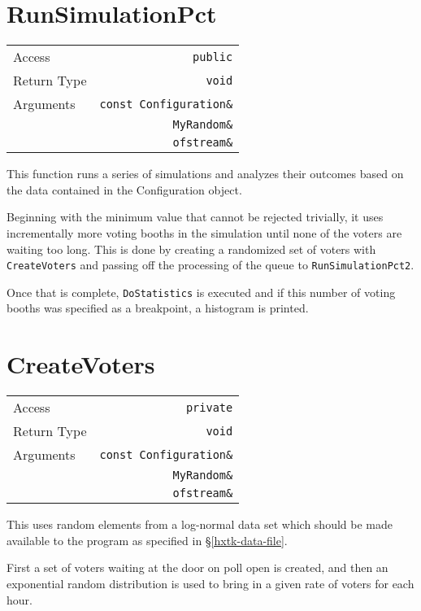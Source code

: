 \section{RunSimulationPct}

\begin{center}
\begin{tabular}{l r}
Access & \texttt{public} \\
Return Type & \texttt{void} \\ \hline
Arguments & \texttt{const Configuration\&}\\
          & \texttt{MyRandom\&}\\
          & \texttt{ofstream\&}
\end{tabular}
\end{center}

This function runs a series of simulations and analyzes their outcomes based on the data contained in the Configuration object.

Beginning with the minimum value that cannot be rejected trivially, it uses incrementally more voting booths in the simulation until none of the voters are waiting too long. This is done by creating a randomized set of voters with \texttt{CreateVoters} and passing off the processing of the queue to \texttt{RunSimulationPct2}.

Once that is complete, \texttt{DoStatistics} is executed and if this number of voting booths was specified as a breakpoint, a histogram is printed.

\section{CreateVoters}

\begin{center}
\begin{tabular}{l r}
Access & \texttt{private} \\
Return Type & \texttt{void} \\ \hline
Arguments & \texttt{const Configuration\&}\\
          & \texttt{MyRandom\&}\\
          & \texttt{ofstream\&}
\end{tabular}
\end{center}

This uses random elements from a log-normal data set which should be made available to the program as specified in \S\ref{hxtk-data-file}.

First a set of voters waiting at the door on poll open is created, and then an exponential random distribution is used to bring in a given rate of voters for each hour.

